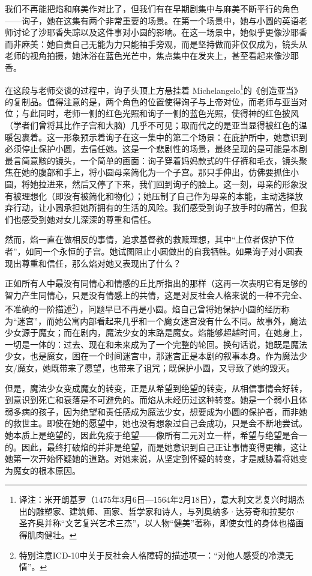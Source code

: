 我们不再能把焰和麻美作对比了，但我们有在早期剧集中与麻美不断平行的角色——询子，她在这集有两个非常重要的场景。在第一个场景中，她与小圆的英语老师讨论了沙耶香失踪以及这件事对小圆的影响。在这一场景中，她似乎更像沙耶香而非麻美：她自责自己无能为力只能袖手旁观，而是坚持做而非仅仅成为，镜头从老师的视角拍摄，她沐浴在蓝色光芒中，焦点集中在发夹上，甚至看起来像沙耶香。

在这段与老师交谈的过程中，询子头顶上方悬挂着 Michelangelo\footnote{译注：米开朗基罗（1475年3月6日—1564年2月18日），意大利文艺复兴时期杰出的雕塑家、建筑师、画家、哲学家和诗人，与列奥纳多·达芬奇和拉斐尔·圣齐奥并称“文艺复兴艺术三杰”，以人物“健美”著称，即使女性的身体也描画得肌肉健壮。}的《创造亚当》的复制品。值得注意的是，两个角色的位置使得询子与上帝对位，而老师与亚当对位；与此同时，老师一侧的红色光照和询子一侧的蓝色光照，使得神的红色披风（学者们曾将其比作子宫\cite{ref66}和大脑\cite{ref67}）几乎不可见；取而代之的是亚当显得被红色的温暖包裹着。这一形象预示着询子在这一集中的第二个场景：在庇护所中，她意识到必须停止保护小圆，去信任她。这是一个悲剧性的场景，最终呈现的是可能是本剧最言简意赅的镜头，一个简单的画面：询子穿着妈妈款式的牛仔裤和毛衣，镜头聚焦在她的腹部和手上，将小圆母亲简化为一个子宫。那只手伸出，仿佛要抓住小圆，将她拉进来，然后又停了下来，我们回到询子的脸上。这一刻，母亲的形象没有被理想化（即没有被简化和物化）；她压制了自己作为母亲的本能，主动选择放弃行动，让小圆承担她所拥有的生活的风险。我们感受到询子放手时的痛苦，但我们也感受到她对女儿深深的尊重和信任。

然而，焰一直在做相反的事情，追求基督教的救赎理想，其中“上位者保护下位者”，如同一个永恒的子宫。她试图阻止小圆做出的自我牺牲。如果询子对小圆表现出尊重和信任，那么焰对她又表现出了什么？

正如所有人中最没有同情心和情感的丘比所指出的那样（这再一次表明它有足够的智力产生同情心，只是没有情感上的共情，这是对反社会人格来说的一种不完全、不准确的一阶描述\footnote{特别注意ICD-10中关于反社会人格障碍的描述项一：“对他人感受的冷漠无情”。}\cite{ref68}），问题早已不再是小圆。焰自己曾将她保护小圆的经历称为“迷宫”，而她公寓内部看起来几乎和一个魔女迷宫没有什么不同。故事外，魔法少女源于魔女；而在剧内，魔法少女的末路是魔女。焰能够超越时间，在她身上，一切是一体的：过去、现在和未来成为了一个完整的轮回。换句话说，她既是魔法少女，也是魔女，困在一个时间迷宫中，那迷宫正是本剧的叙事本身。作为魔法少女/魔女，她既带来了愿望，也带来了诅咒；既保护小圆，又导致了她的毁灭。

但是，魔法少女变成魔女的转变，正是从希望到绝望的转变，从相信事情会好转，到意识到死亡和衰落是不可避免的。而焰从未经历过这种转变。她是一个弱小且体弱多病的孩子，因为绝望和责任感成为魔法少女，想要成为小圆的保护者，而非她的救世主。即使在她的愿望中，她也没有想象过自己会成功，只是会不断地尝试。她本质上是绝望的，因此免疫于绝望——像所有二元对立一样，希望与绝望是合一的。因此，最终打破焰的并非是绝望，而是她意识到自己正让事情变得更糟，这让她第一次开始怀疑她的道路。对她来说，从坚定到怀疑的转变，才是威胁着将她变为魔女的根本原因。

